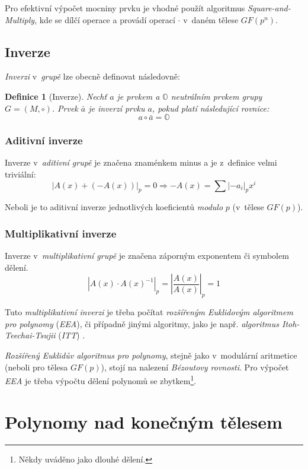 \documentclass[thesis=M,czech,hidelinks]{FITthesis}[2012/06/26]
\newtheorem{definice}{Definice}
\begin{document}
Pro efektivní výpočet mocniny prvku je vhodné použít algoritmus
\emph{Square-and-Multiply}, kde se dílčí operace  a 
provádí operací $\cdot$ v~daném tělese $GF(p^n)$.

\subsection{Inverze}
\emph{Inverzi} v~\emph{grupě} lze obecně definovat následovně:
\begin{definice}[Inverze]
    Nechť $a$ je prvkem a $\mathbb{O}$ neutrálním prvkem \emph{grupy} \\
    $G = (M,\circ)$. Prvek $\bar{a}$ je \emph{inverzí} prvku $a$, pokud
    platí následující rovnice:
    $$ a \circ \bar{a} = \mathbb{O} $$
\end{definice}

\subsubsection{Aditivní inverze}
Inverze v~\emph{aditivní grupě} je značena znaménkem minus \uv{$-$} a je
z~definice velmi triviální:
$$ \left| A(x) + (-A(x)) \right|_p = 0 \Rightarrow
-A(x) = \sum \left|-a_i\right|_p x^i $$

Neboli je to aditivní inverze jednotlivých koeficientů \emph{modulo} $p$
(v~tělese $GF(p)$).


\subsubsection{Multiplikativní inverze}
Inverze v~\emph{multiplikativní grupě} je značena záporným exponentem
 či symbolem dělení.
$$ \left| A(x) \cdot A(x)^{-1} \right|_p =
\left| \frac{A(x)}{A(x)} \right|_p = 1 $$

Tuto \emph{multiplikativní inverzi} je třeba počítat \emph{rozšířeným Euklidovým
algoritmem pro polynomy} (\emph{EEA}), či případně jinými algoritmy, jako je např.
\emph{algoritmus Itoh-Teechai-Tsujii} (\emph{ITT}) \cite{FIT_BHW,ITT}.

\emph{Rozšířený Euklidův algoritmus} \emph{pro polynomy}, stejně jako v~modulární
aritmetice (neboli pro tělesa $GF(p)$), stojí na nalezení \emph{Bézoutovy
rovnosti}. Pro výpočet \emph{EEA} je třeba výpočtu dělení polynomů se
zbytkem\footnote{
Někdy uváděno jako dlouhé dělení.
}.


\section{Polynomy nad konečným tělesem}
\end{document}
